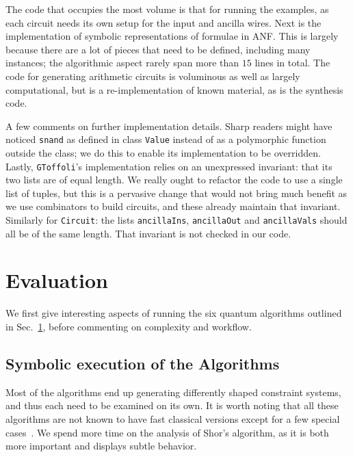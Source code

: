 \documentclass[sigplan,screen]{acmart}
\theoremstyle{definition}
\begin{document}
The code that occupies the most volume is that for running the examples, as each
circuit needs its own setup for the input and ancilla wires. Next is the implementation
of symbolic representations of formulae in ANF. This is largely because there are a
lot of pieces that need to be defined, including many instances; the algorithmic aspect
rarely span more than $15$ lines in total. The code for generating arithmetic circuits
is voluminous as well as largely computational, but is a re-implementation of known
material, as is the synthesis code.

A few comments on further implementation details. Sharp readers might have noticed
\texttt{snand} as defined in class \texttt{Value} instead of as a polymorphic function
outside the class; we do this to enable its implementation to be overridden.
Lastly, \texttt{GToffoli}'s implementation relies on an unexpressed invariant: that its
two lists are of equal length. We really ought to refactor the code to use a single
list of tuples, but this is a pervasive change that would not bring much benefit as
we use combinators to build circuits, and these already maintain that invariant.
Similarly for \texttt{Circuit}: the lists \texttt{ancillaIns}, \texttt{ancillaOut}
and \texttt{ancillaVals} should all be of the same length. That invariant is not
checked in our code.

\section{Evaluation}
\label{sec5}

We first give interesting aspects of running the six quantum algorithms
outlined in Sec.~\ref{sec5}, before commenting on complexity and workflow.

\subsection{Symbolic execution of the Algorithms}

Most of the algorithms end up generating differently shaped constraint
systems, and thus each need to be examined on its own. It is worth
noting that all these algorithms are not known to have fast classical
versions except for a few special cases~\cite{calude,djdeq}. We spend more
time on the analysis of Shor's algorithm, as it is both more important
and displays subtle behavior.
\end{document}
